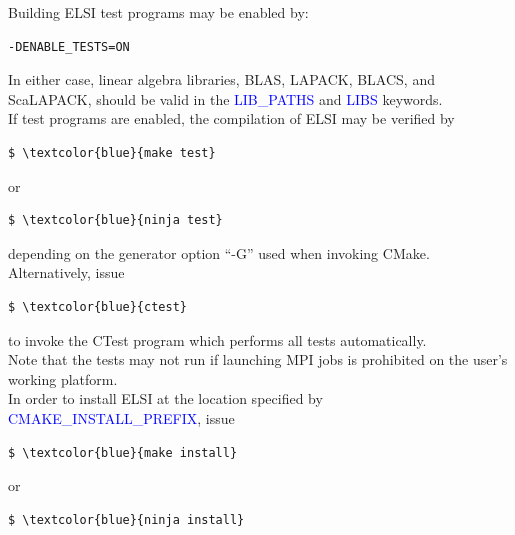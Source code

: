 \documentclass{report}
\begin{document}
Building ELSI test programs may be enabled by:\\

\begin{verbatim}
-DENABLE_TESTS=ON
\end{verbatim}

In either case, linear algebra libraries, BLAS, LAPACK, BLACS, and ScaLAPACK, should be valid in the \textcolor{blue}{LIB\_PATHS} and \textcolor{blue}{LIBS} keywords.\\

If test programs are enabled, the compilation of ELSI may be verified by\\

\begin{Verbatim}[commandchars=\\\{\}]
$ \textcolor{blue}{make test}
\end{Verbatim}

or\\

\begin{Verbatim}[commandchars=\\\{\}]
$ \textcolor{blue}{ninja test}
\end{Verbatim}

depending on the generator option ``-G'' used when invoking CMake.  Alternatively, issue\\

\begin{Verbatim}[commandchars=\\\{\}]
$ \textcolor{blue}{ctest}
\end{Verbatim}

to invoke the CTest program which performs all tests automatically.\\

Note that the tests may not run if launching MPI jobs is prohibited on the user's working platform.\\

In order to install ELSI at the location specified by \textcolor{blue}{CMAKE\_INSTALL\_PREFIX}, issue\\

\begin{Verbatim}[commandchars=\\\{\}]
$ \textcolor{blue}{make install}
\end{Verbatim}

or\\

\begin{Verbatim}[commandchars=\\\{\}]
$ \textcolor{blue}{ninja install}
\end{Verbatim}
\end{document}
